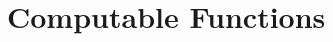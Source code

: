 \documentclass[12pt]{article}
\begin{document}
\maketitle
\tableofcontents
\newpage
\section{Computable Functions}

\end{document}
